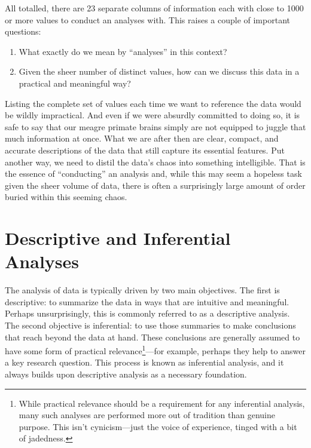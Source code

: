 

All totalled, there are 23 separate columns of information each with close to 1000 or more values to conduct an analyses with. This raises a couple of important questions:

\begin{enumerate}
    \item What exactly do we mean by ``analyses'' in this context?
    \item Given the sheer number of distinct values, how can we discuss this data in a practical and meaningful way?
\end{enumerate}

Listing the complete set of values each time we want to reference the data would be wildly impractical. And even if we were absurdly committed to doing so, it is safe to say that our meagre primate brains simply are not equipped to juggle that much information at once. What we are after then are clear, compact, and accurate descriptions of the data that still capture its essential features. Put another way, we need to distil the data's chaos into something intelligible. That is the essence of ``conducting'' an analysis and, while this may seem a hopeless task given the sheer volume of data, there is often a surprisingly large amount of order buried within this seeming chaos.

\section{Descriptive and Inferential Analyses}

The analysis of data is typically driven by two main objectives. The first is descriptive: to summarize the data in ways that are intuitive and meaningful. Perhaps unsurprisingly, this is commonly referred to as a \gls{descriptive analysis}. The second objective is inferential: to use those summaries to make conclusions that reach beyond the data at hand. These conclusions are generally assumed to have some form of practical relevance\footnote{While practical relevance should be a requirement for any inferential analysis, many such analyses are performed more out of tradition than genuine purpose. This isn't cynicism—just the voice of experience, tinged with a bit of jadedness.}—for example, perhaps they help to answer a key research question. This process is known as \gls{inferential analysis}, and it always builds upon descriptive analysis as a necessary foundation.

